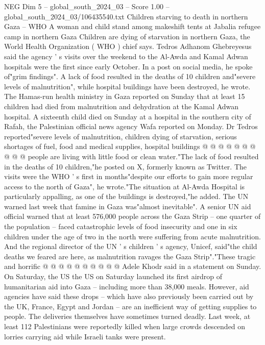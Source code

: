 \begin{textsample}{NEG Dim 5 – global\_south\_2024\_03 – Score 1.00 – global\_south\_2024\_03/106435540.txt}  \label{ex:f5_neg_318}
Children starving to death in northern Gaza -- WHO A woman and child stand among makeshift tents at Jabalia refugee camp in northern Gaza Children are dying of starvation in northern Gaza, the World Health Organization ( WHO ) chief says.
Tedros Adhanom Ghebreyesus said the agency ' s visits over the weekend to the Al-Awda and Kamal Adwan hospitals were the first since early October.
In a post on social media, he spoke of"grim findings".
A lack of food resulted in the deaths of 10 children and"severe levels of malnutrition", while hospital buildings have been destroyed, he wrote.
The Hamas-run health ministry in Gaza reported on Sunday that at least 15 children had died from malnutrition and dehydration at the Kamal Adwan hospital.
A sixteenth child died on Sunday at a hospital in the southern city of Rafah, the Palestinian official news agency Wafa reported on Monday.
Dr Tedros reported"severe levels of malnutrition, children dying of starvation, serious shortages of fuel, food and medical supplies, hospital buildings @ @ @ @ @ @ @ @ @ @ people are living with little food or clean water."The lack of food resulted in the deaths of 10 children,"he posted on X, formerly known as Twitter.
The visits were the WHO ' s first in months"despite our efforts to gain more regular access to the north of Gaza", he wrote."The situation at Al-Awda Hospital is particularly appalling, as one of the buildings is destroyed,"he added.
The UN warned last week that famine in Gaza was"almost inevitable".
A senior UN aid official warned that at least 576,000 people across the Gaza Strip -- one quarter of the population -- faced catastrophic levels of food insecurity and one in six children under the age of two in the north were suffering from acute malnutrition.
And the regional director of the UN ' s children ' s agency, Unicef, said"the child deaths we feared are here, as malnutrition ravages the Gaza Strip"."These tragic and horrific @ @ @ @ @ @ @ @ @ @ Adele Khodr said in a statement on Sunday.
On Saturday, the US the US on Saturday launched its first airdrop of humanitarian aid into Gaza -- including more than 38,000 meals.
However, aid agencies have said these drops -- which have also previously been carried out by the UK, France, Egypt and Jordan -- are an inefficient way of getting supplies to people.
The deliveries themselves have sometimes turned deadly.
Last week, at least 112 Palestinians were reportedly killed when large crowds descended on lorries carrying aid while Israeli tanks were present.

\end{textsample}
